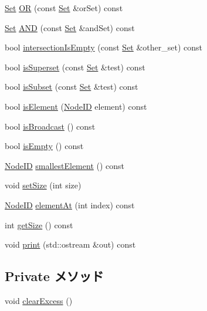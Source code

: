 \begin{DoxyCompactItemize}
\hyperlink{classSet}{Set} \hyperlink{classSet_aaba9e97960a8c78f28a2fe8f28e5b37a}{OR} (const \hyperlink{classSet}{Set} \&orSet) const 
\item 
\hyperlink{classSet}{Set} \hyperlink{classSet_a090263cd0c6181f2cb60641253dd6413}{AND} (const \hyperlink{classSet}{Set} \&andSet) const 
\item 
bool \hyperlink{classSet_a6746cdf4bc4e7e90ce81d368ac57c125}{intersectionIsEmpty} (const \hyperlink{classSet}{Set} \&other\_\-set) const 
\item 
bool \hyperlink{classSet_afa8a7c09df1409cc3cbf2c0a8a9758c9}{isSuperset} (const \hyperlink{classSet}{Set} \&test) const 
\item 
bool \hyperlink{classSet_a103a25450363d9ffaf73f74e3690be62}{isSubset} (const \hyperlink{classSet}{Set} \&test) const 
\item 
bool \hyperlink{classSet_a86a028497c9a1969149e86b34685ae2d}{isElement} (\hyperlink{TypeDefines_8hh_a83c14b4ae37e80071f6b3506a6c46151}{NodeID} element) const 
\item 
bool \hyperlink{classSet_ad6e06804cf170a9f5925776696c32060}{isBroadcast} () const 
\item 
bool \hyperlink{classSet_a479432127ee77145cc19d6a2d1590821}{isEmpty} () const 
\item 
\hyperlink{TypeDefines_8hh_a83c14b4ae37e80071f6b3506a6c46151}{NodeID} \hyperlink{classSet_a0df0ef450758d1afd49a460353d702da}{smallestElement} () const 
\item 
void \hyperlink{classSet_a72020e2e3721c814d7a5ff1dac539484}{setSize} (int size)
\item 
\hyperlink{TypeDefines_8hh_a83c14b4ae37e80071f6b3506a6c46151}{NodeID} \hyperlink{classSet_ace4040d47fd875f3fac8516a49d5b416}{elementAt} (int index) const 
\item 
int \hyperlink{classSet_a4f8dbb76319fe40792867d6ca51ef447}{getSize} () const 
\item 
void \hyperlink{classSet_ac55fe386a101fbae38c716067c9966a0}{print} (std::ostream \&out) const 
\end{DoxyCompactItemize}
\subsection*{Private メソッド}
\begin{DoxyCompactItemize}
\item 
void \hyperlink{classSet_aa7e5ecedaad0a7d835a819cb8f568f4a}{clearExcess} ()
\end{DoxyCompactItemize}
